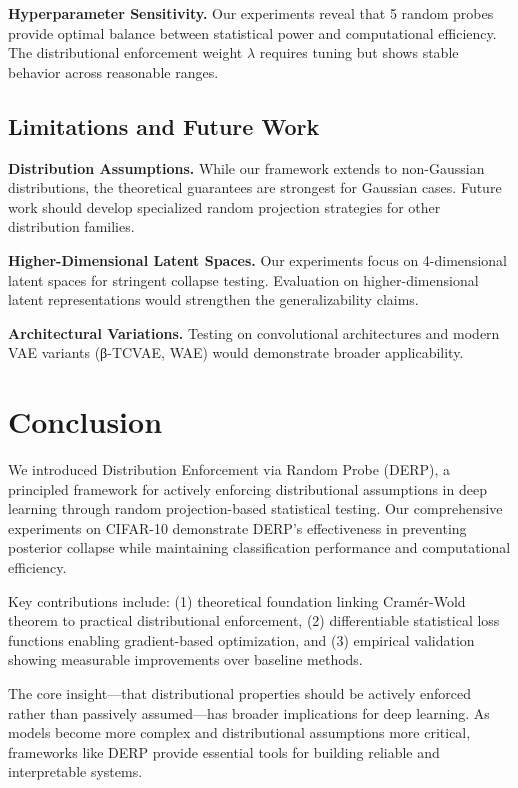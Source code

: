 \documentclass{article}
\begin{document}
\textbf{Hyperparameter Sensitivity.} Our experiments reveal that 5 random probes provide optimal balance between statistical power and computational efficiency. The distributional enforcement weight $\lambda$ requires tuning but shows stable behavior across reasonable ranges.

\subsection{Limitations and Future Work}

\textbf{Distribution Assumptions.} While our framework extends to non-Gaussian distributions, the theoretical guarantees are strongest for Gaussian cases. Future work should develop specialized random projection strategies for other distribution families.

\textbf{Higher-Dimensional Latent Spaces.} Our experiments focus on 4-dimensional latent spaces for stringent collapse testing. Evaluation on higher-dimensional latent representations would strengthen the generalizability claims.

\textbf{Architectural Variations.} Testing on convolutional architectures and modern VAE variants (β-TCVAE, WAE) would demonstrate broader applicability.

\section{Conclusion}

We introduced Distribution Enforcement via Random Probe (DERP), a principled framework for actively enforcing distributional assumptions in deep learning through random projection-based statistical testing. Our comprehensive experiments on CIFAR-10 demonstrate DERP's effectiveness in preventing posterior collapse while maintaining classification performance and computational efficiency.

Key contributions include: (1) theoretical foundation linking Cramér-Wold theorem to practical distributional enforcement, (2) differentiable statistical loss functions enabling gradient-based optimization, and (3) empirical validation showing measurable improvements over baseline methods.

The core insight—that distributional properties should be actively enforced rather than passively assumed—has broader implications for deep learning. As models become more complex and distributional assumptions more critical, frameworks like DERP provide essential tools for building reliable and interpretable systems.
\end{document}
